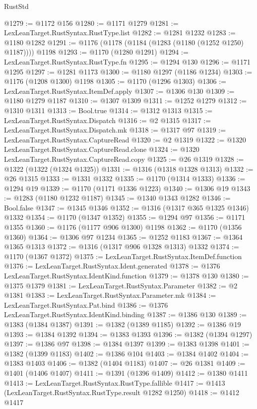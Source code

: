 \begin{lexlean}{RustStd}
\begin{coremodule}
@1279 := @1172 @156
@1280 := @1171 @1279
@1281 := LexLeanTarget.RustSyntax.RustType.list
@1282 := @1281 @1232
@1283 := @1180 @1282
@1291 := @1176 (@1178 (@1184 (@1283 (@1180 (@1252 @1250) @1187)))) @1198
@1293 := @1170 (@1280 @1291)
@1294 := LexLeanTarget.RustSyntax.RustType.fn
@1295 := @1294 @130
@1296 := @1171 @1295
@1297 := @1281 @1173
@1300 := @1180 @1297 (@1186 @1234)
@1303 := @1176 (@1208 @1300) @1198
@1305 := @1170 (@1296 @1303)
@1306 := LexLeanTarget.RustSyntax.ItemDef.apply
@1307 := @1306 @130
@1309 := @1180 @1279 @1187
@1310 := @1307 @1309
@1311 := @1252 @1279
@1312 := @1310 @1311
@1313 := Bool.true
@1314 := @1312 @1313
@1315 := LexLeanTarget.RustSyntax.Dispatch
@1316 := @2 @1315
@1317 := LexLeanTarget.RustSyntax.Dispatch.mk
@1318 := @1317 @97
@1319 := LexLeanTarget.RustSyntax.CaptureRead
@1320 := @2 @1319
@1322 := @1320 LexLeanTarget.RustSyntax.CaptureRead.clone
@1324 := @1320 LexLeanTarget.RustSyntax.CaptureRead.copy
@1325 := @26 @1319
@1328 := @1322 (@1322 (@1324 @1325))
@1331 := @1316 (@1318 @1328 @1313)
@1332 := @26 @1315
@1333 := @1331 @1332
@1335 := @1170 (@1314 @1333)
@1336 := @1294 @19
@1339 := @1170 (@1171 @1336 @1223)
@1340 := @1306 @19
@1343 := @1283 (@1180 @1232 @1187)
@1345 := @1340 @1343 @1282
@1346 := Bool.false
@1347 := @1345 @1346
@1352 := @1316 (@1317 @365 @1325 @1346) @1332
@1354 := @1170 (@1347 @1352)
@1355 := @1294 @97
@1356 := @1171 @1355
@1360 := @1176 (@1177 @906 @1300) @1198
@1362 := @1170 (@1356 @1360)
@1364 := @1306 @97 @1234
@1365 := @1252 @1183
@1367 := @1364 @1365 @1313
@1372 := @1316 (@1317 @906 @1328 @1313) @1332
@1374 := @1170 (@1367 @1372)
@1375 := LexLeanTarget.RustSyntax.ItemDef.function
@1376 := LexLeanTarget.RustSyntax.Ident.generated
@1378 := @1376 LexLeanTarget.RustSyntax.IdentKind.function
@1379 := @1378 @130
@1380 := @1375 @1379
@1381 := LexLeanTarget.RustSyntax.Parameter
@1382 := @2 @1381
@1383 := LexLeanTarget.RustSyntax.Parameter.mk
@1384 := LexLeanTarget.RustSyntax.Pat.bind
@1386 := @1376 LexLeanTarget.RustSyntax.IdentKind.binding
@1387 := @1386 @130
@1389 := @1383 (@1384 @1387)
@1391 := @1382 (@1389 @1185)
@1392 := @1386 @19
@1393 := @1384 @1392
@1394 := @1383 @1393
@1396 := @1382 (@1394 @1297)
@1397 := @1386 @97
@1398 := @1384 @1397
@1399 := @1383 @1398
@1401 := @1382 (@1399 @1183)
@1402 := @1386 @104
@1403 := @1384 @1402
@1404 := @1383 @1403
@1406 := @1382 (@1404 @1183)
@1407 := @26 @1381
@1409 := @1401 (@1406 @1407)
@1411 := @1391 (@1396 @1409)
@1412 := @1380 @1411
@1413 := LexLeanTarget.RustSyntax.RustType.fallible
@1417 := @1413 (LexLeanTarget.RustSyntax.RustType.result @1282 @1250)
@1418 := @1412 @1417

\end{coremodule}
\end{lexlean}
